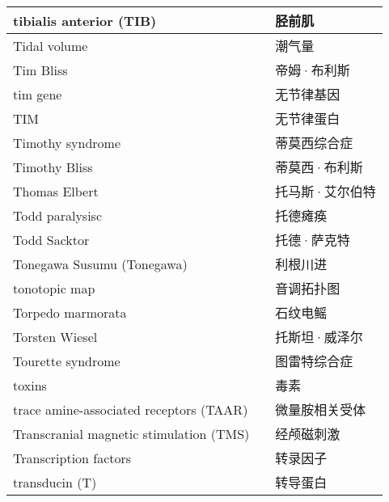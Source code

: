 \begin{longtable}{lll}
	\midrule
	tibialis anterior (TIB) && 胫前肌  \\
	
	\midrule
	Tidal volume  && 潮气量  \\
	
	\midrule
	Tim Bliss  && 帝姆·布利斯  \\
	
	\midrule
	tim gene  && 无节律基因  \\
	
	\midrule
	TIM  && 无节律蛋白  \\
	
	\midrule
	Timothy syndrome  && 蒂莫西综合症  \\
	
	\midrule
	Timothy Bliss  && 蒂莫西·布利斯  \\
	
	\midrule
	Thomas Elbert   && 托马斯·艾尔伯特  \\
	
	\midrule
	Todd paralysisc   && 托德瘫痪  \\
	
	\midrule
	Todd Sacktor   && 托德·萨克特  \\
	
	\midrule
	Tonegawa Susumu (Tonegawa)   && 利根川进  \\
	
	\midrule
	tonotopic map   && 音调拓扑图  \\
	
	\midrule
	Torpedo marmorata   && 石纹电鳐  \\
	
	\midrule
	Torsten Wiesel   && 托斯坦·威泽尔  \\
	
	\midrule
	Tourette syndrome   && 图雷特综合症  \\
	
	\midrule
	toxins   && 毒素  \\
	
	\midrule
	trace amine-associated receptors (TAAR)   && 微量胺相关受体  \\
	
	\midrule
	Transcranial magnetic stimulation (TMS)   && 经颅磁刺激  \\
	
	\midrule
	Transcription factors   && 转录因子  \\
	
	\midrule
	transducin (T)   && 转导蛋白  \\
	

\end{longtable}
